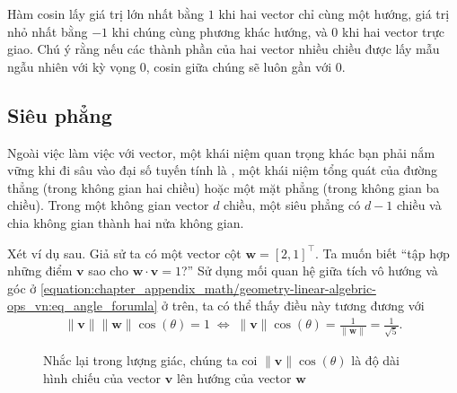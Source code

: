 \documentclass[letterpaper,11pt,english]{sphinxmanual}
\begin{document}
Hàm cosin lấy giá trị lớn nhất bằng \(1\) khi hai vector chỉ cùng
một hướng, giá trị nhỏ nhất bằng \(-1\) khi chúng cùng phương khác
hướng, và \(0\) khi hai vector trực giao. Chú ý rằng nếu các thành
phần của hai vector nhiều chiều được lấy mẫu ngẫu nhiên với kỳ vọng
\(0\), cosin giữa chúng sẽ luôn gần với \(0\).




\subsection{Siêu phẳng}
\label{\detokenize{chapter_appendix_math/geometry-linear-algebric-ops_vn:sieu-phang}}


Ngoài việc làm việc với vector, một khái niệm quan trọng khác bạn phải
nắm vững khi đi sâu vào đại số tuyến tính là , một khái niệm
tổng quát của đường thẳng (trong không gian hai chiều) hoặc một mặt
phẳng (trong không gian ba chiều). Trong một không gian vector \(d\)
chiều, một siêu phẳng có \(d-1\) chiều và chia không gian thành hai
nửa không gian.



Xét ví dụ sau. Giả sử ta có một vector cột
\(\mathbf{w}=[2,1]^\top\). Ta muốn biết “tập hợp những điểm
\(\mathbf{v}\) sao cho \(\mathbf{w}\cdot\mathbf{v} = 1\)?” Sử
dụng mối quan hệ giữa tích vô hướng và góc ở \eqref{equation:chapter_appendix_math/geometry-linear-algebric-ops_vn:eq_angle_forumla}
ở trên, ta có thể thấy điều này tương đương với
\begin{equation}\label{equation:chapter_appendix_math/geometry-linear-algebric-ops_vn:chapter_appendix_math/geometry-linear-algebric-ops_vn:7}
\begin{split}\|\mathbf{v}\|\|\mathbf{w}\|\cos(\theta) = 1 \; \iff \; \|\mathbf{v}\|\cos(\theta) = \frac{1}{\|\mathbf{w}\|} = \frac{1}{\sqrt{5}}.\end{split}
\end{equation}


\begin{figure}[H]
\centering
\capstart

\noindent{}
\caption{Nhắc lại trong lượng giác, chúng ta coi
\(\|\mathbf{v}\|\cos(\theta)\) là độ dài hình chiếu của vector
\(\mathbf{v}\) lên hướng của vector \(\mathbf{w}\)}\label{\detokenize{chapter_appendix_math/geometry-linear-algebric-ops_vn:id7}}\label{\detokenize{chapter_appendix_math/geometry-linear-algebric-ops_vn:fig-vector-project}}\end{figure}
\end{document}
